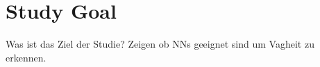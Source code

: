 \section{Study Goal}
\label{chp:study:sec:study_goal}
Was ist das Ziel der Studie?
Zeigen ob \acp{NN} geeignet sind um Vagheit zu erkennen.
